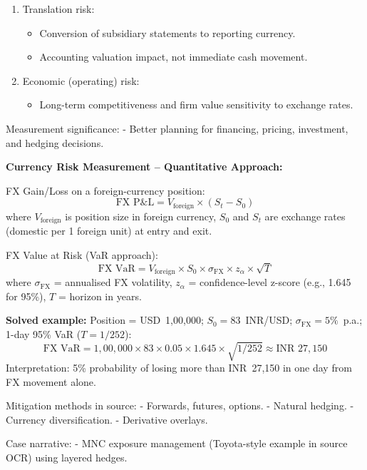 \documentclass[
]{article}
\providecommand{\tightlist}{%
  \setlength{\itemsep}{0pt}\setlength{\parskip}{0pt}}
\begin{document}
\begin{enumerate}
\def\labelenumi{\arabic{enumi}.}
\setcounter{enumi}{1}
\tightlist
\item
  Translation risk:

  \begin{itemize}
  \tightlist
  \item
    Conversion of subsidiary statements to reporting currency.
  \item
    Accounting valuation impact, not immediate cash movement.
  \end{itemize}
\item
  Economic (operating) risk:

  \begin{itemize}
  \tightlist
  \item
    Long-term competitiveness and firm value sensitivity to exchange
    rates.
  \end{itemize}
\end{enumerate}

Measurement significance: - Better planning for financing, pricing,
investment, and hedging decisions.

\textbf{Currency Risk Measurement -- Quantitative Approach:}

FX Gain/Loss on a foreign-currency position:
\[
\text{FX P\&L} = V_{\text{foreign}} \times (S_t - S_0)
\]
where $V_{\text{foreign}}$ is position size in foreign currency, $S_0$ and $S_t$ are exchange rates (domestic per 1 foreign unit) at entry and exit.

FX Value at Risk (VaR approach):
\[
\text{FX VaR} = V_{\text{foreign}} \times S_0 \times \sigma_{\text{FX}} \times z_\alpha \times \sqrt{T}
\]
where $\sigma_{\text{FX}}$ = annualised FX volatility, $z_\alpha$ = confidence-level z-score (e.g., 1.645 for 95\%), $T$ = horizon in years.

\textbf{Solved example:}
Position = USD~1,00,000; $S_0 = 83$~INR/USD; $\sigma_{\text{FX}} = 5\%$~p.a.; 1-day 95\% VaR ($T = 1/252$):
\[
\text{FX VaR} = 1{,}00{,}000\times83\times0.05\times1.645\times\sqrt{1/252} \approx \text{INR }27{,}150
\]
Interpretation: 5\% probability of losing more than INR~27,150 in one day from FX movement alone.

Mitigation methods in source: - Forwards, futures, options. - Natural
hedging. - Currency diversification. - Derivative overlays.

Case narrative: - MNC exposure management (Toyota-style example in
source OCR) using layered hedges.
\end{document}
